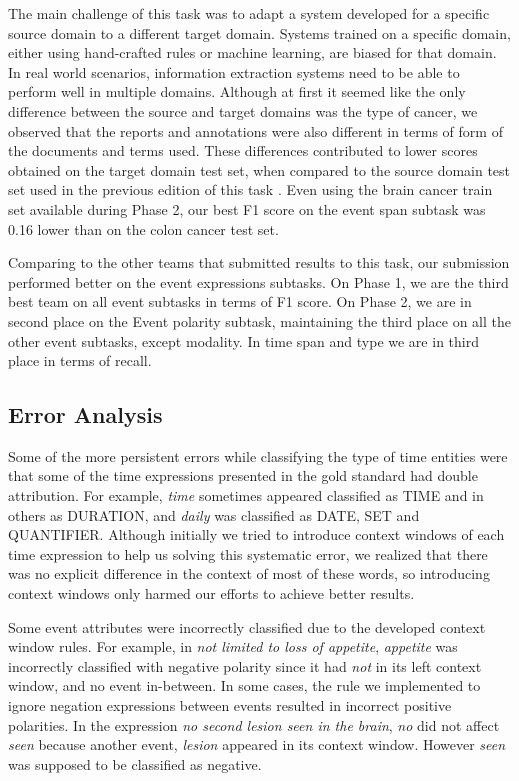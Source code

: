 \documentclass[11pt,a4paper]{article}
\begin{document}
The main challenge of this task was to adapt a system developed for a specific source domain to a different target domain.
Systems trained on a specific domain, either using hand-crafted rules or machine learning, are biased for that domain.
In real world scenarios, information extraction systems need to be able to perform well in multiple domains.
Although at first it seemed like the only difference between the source and target domains was the type of cancer, we observed that the reports and annotations were also different in terms of form of the documents and terms used.
These differences contributed to lower scores obtained on the target domain test set, when compared to the source domain test set used in the previous edition of this task \cite{Bethard2016}.
Even using the brain cancer train set available during Phase 2, our best F1 score on the event span subtask was 0.16 lower than on the colon cancer test set.

Comparing to the other teams that submitted results to this task, our submission performed better on the event expressions subtasks.
On Phase 1, we are the third best team on all event subtasks in terms of F1 score.
On Phase 2, we are in second place on the Event polarity subtask, maintaining the third place 
on all the other event subtasks, except modality. In time span and type we are in third place 
in terms of recall.

\subsection{Error Analysis}



Some of the more persistent errors while classifying the type of time entities were that some of the time expressions presented in the gold standard had double attribution.
For example, \textit{time} sometimes appeared classified as TIME and in others as DURATION, and \textit{daily} was classified as DATE, SET and QUANTIFIER. 
Although initially we tried to introduce context windows of each time expression to help us solving this systematic error, we realized that there was no explicit difference in the context of most of these words, so introducing context windows only harmed our efforts to achieve better results.

Some event attributes were incorrectly classified due to the developed context window rules.
For example, in \textit{not limited to loss of appetite}, \textit{appetite} was incorrectly classified with negative polarity since it had \textit{not} in its left context window, and no event in-between.
In some cases, the rule we implemented to ignore negation expressions between events resulted in incorrect positive polarities.
In the expression \textit{no second lesion seen in the brain},
\textit{no} did not affect \textit{seen} because another event, \textit{lesion} appeared in its context window.
However \textit{seen} was supposed to be classified as negative.
\end{document}
